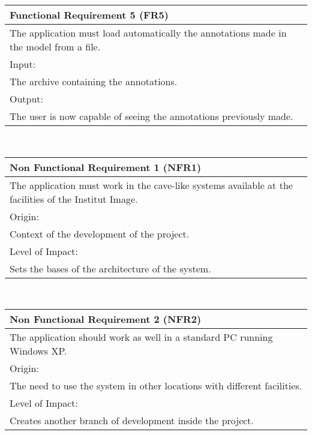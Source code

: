\begin{center}
\begin{tabular}{p{12.6cm}}
	\hline
	{\Large Functional Requirement 5 (FR5)}\\ \hline \hline
	The application must load automatically the annotations made in the model from a file. \\ \hline
	\large{Input:}\\ \hline
	The archive containing the annotations.\\ \hline \hline
	\large{Output:}\\ \hline
	The user is now capable of seeing the annotations previously made.\\
	\hline
\end{tabular}\\
\vspace{10mm}



\begin{tabular}{p{12.6cm}}
	\hline
	{\Large Non Functional Requirement 1 (NFR1)}\\ \hline \hline
	The application must work in the cave-like systems available at the facilities of the Institut Image. \\ \hline
	\large{Origin:}\\ \hline
	Context of the development of the project.\\ \hline \hline
	\large{Level of Impact:}\\ \hline
	Sets the bases of the architecture of the system.\\
	\hline
\end{tabular}\\
\vspace{10mm}

\begin{tabular}{p{12.6cm}}
	\hline
	{\Large Non Functional Requirement 2 (NFR2)}\\ \hline \hline
	The application should work as well in a standard PC running Windows XP. \\ \hline
	\large{Origin:}\\ \hline
	The need to use the system in other locations with different facilities.\\ \hline \hline
	\large{Level of Impact:}\\ \hline
	Creates another branch of development inside the project.\\
	\hline
\end{tabular}\\
\vspace{10mm}


\end{center}

